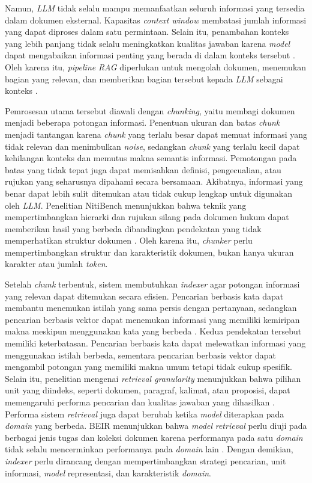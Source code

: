 Namun, \emph{LLM} tidak selalu mampu memanfaatkan seluruh informasi yang tersedia dalam
dokumen eksternal. Kapasitas \emph{context window} membatasi jumlah informasi yang
dapat diproses dalam satu permintaan. Selain itu, penambahan konteks yang lebih
panjang tidak selalu meningkatkan kualitas jawaban karena \emph{model} dapat mengabaikan
informasi penting yang berada di dalam konteks tersebut
\parencite{liuLostMiddle2024}. Oleh karena itu, \emph{pipeline} \emph{RAG} diperlukan untuk
mengolah dokumen, menemukan bagian yang relevan, dan memberikan bagian tersebut
kepada \emph{LLM} sebagai konteks
\parencite{lewisRetrievalAugmentedGenerationKnowledgeIntensive2021}.

Pemrosesan utama tersebut diawali dengan \emph{chunking}, yaitu membagi dokumen
menjadi beberapa potongan informasi. Penentuan ukuran dan batas \emph{chunk}
menjadi tantangan karena \emph{chunk} yang terlalu besar dapat memuat informasi
yang tidak relevan dan menimbulkan \emph{noise}, sedangkan \emph{chunk} yang
terlalu kecil dapat kehilangan konteks dan memutus makna semantis informasi.
Pemotongan pada batas yang tidak tepat juga dapat memisahkan definisi,
pengecualian, atau rujukan yang seharusnya dipahami secara bersamaan. Akibatnya,
informasi yang benar dapat lebih sulit ditemukan atau tidak cukup lengkap untuk
digunakan oleh \emph{LLM}. Penelitian NitiBench menunjukkan bahwa teknik yang
mempertimbangkan hierarki dan rujukan silang pada dokumen hukum dapat memberikan
hasil yang berbeda dibandingkan pendekatan yang tidak memperhatikan struktur
dokumen \parencite{akarajaradwongNitiBenchComprehensiveStudy2025}. Oleh karena itu,
\emph{chunker} perlu mempertimbangkan struktur dan karakteristik dokumen, bukan
hanya ukuran karakter atau jumlah \emph{token}.

Setelah \emph{chunk} terbentuk, sistem membutuhkan \emph{indexer} agar potongan
informasi yang relevan dapat ditemukan secara efisien. Pencarian berbasis kata
dapat membantu menemukan istilah yang sama persis dengan pertanyaan, sedangkan
pencarian berbasis vektor dapat menemukan informasi yang memiliki kemiripan makna
meskipun menggunakan kata yang berbeda
\parencite{robertsonProbabilisticRelevanceFramework2009,
karpukhinDensePassageRetrieval2020}. Kedua pendekatan tersebut memiliki
keterbatasan. Pencarian berbasis kata dapat melewatkan informasi yang
menggunakan istilah berbeda, sementara pencarian berbasis vektor dapat mengambil
potongan yang memiliki makna umum tetapi tidak cukup spesifik. Selain itu,
penelitian mengenai \emph{retrieval granularity} menunjukkan bahwa pilihan unit
yang diindeks, seperti dokumen, paragraf, kalimat, atau proposisi, dapat
memengaruhi performa pencarian dan kualitas jawaban yang dihasilkan
\parencite{chenDenseXRetrieval2023}. Performa sistem \emph{retrieval} juga dapat berubah
ketika \emph{model} diterapkan pada \emph{domain} yang berbeda. BEIR menunjukkan bahwa \emph{model}
\emph{retrieval} perlu diuji pada berbagai jenis tugas dan koleksi dokumen karena
performanya pada satu \emph{domain} tidak selalu mencerminkan performanya pada \emph{domain}
lain \parencite{thakurBEIRHeterogeneousBenchmark2021}. Dengan demikian,
\emph{indexer} perlu dirancang dengan mempertimbangkan strategi pencarian, unit
informasi, \emph{model} representasi, dan karakteristik \emph{domain}.

